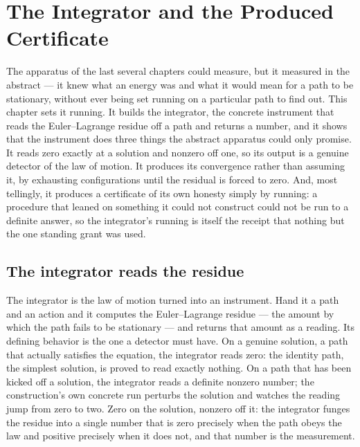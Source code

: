 \chapter{The Integrator and the Produced Certificate}
\label{chap:integrator-produced-certificate}

The apparatus of the last several chapters could measure, but it measured in the abstract --- it knew
what an energy was and what it would mean for a path to be stationary, without ever being set running on
a particular path to find out. This chapter sets it running. It builds the integrator, the concrete
instrument that reads the Euler--Lagrange residue off a path and returns a number, and it shows that the
instrument does three things the abstract apparatus could only promise. It reads zero exactly at a
solution and nonzero off one, so its output is a genuine detector of the law of motion. It produces its
convergence rather than assuming it, by exhausting configurations until the residual is forced to zero.
And, most tellingly, it produces a certificate of its own honesty simply by running: a procedure that
leaned on something it could not construct could not be run to a definite answer, so the integrator's
running is itself the receipt that nothing but the one standing grant was used.

\section{The integrator reads the residue}
\label{se:the-integrator-reads-the-residue}

The integrator is the law of motion turned into an instrument. Hand it a path and an action and it
computes the Euler--Lagrange residue --- the amount by which the path fails to be stationary --- and
returns that amount as a reading. Its defining behavior is the one a detector must have. On a genuine
solution, a path that actually satisfies the equation, the integrator reads zero: the identity path, the
simplest solution, is proved to read exactly nothing. On a path that has been kicked off a solution, the
integrator reads a definite nonzero number; the construction's own concrete run perturbs the solution and
watches the reading jump from zero to two. Zero on the solution, nonzero off it: the integrator funges
the residue into a single number that is zero precisely when the path obeys the law and positive
precisely when it does not, and that number is the measurement.

